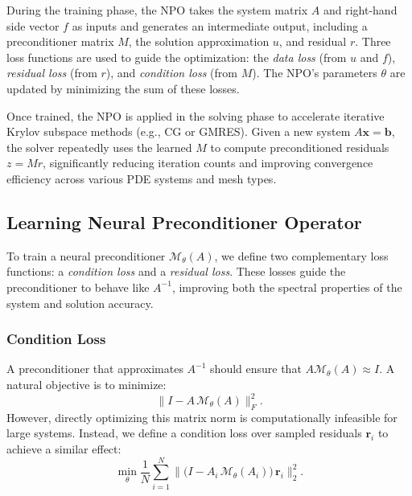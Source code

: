 During the training phase, the NPO takes the system matrix \(A\) and right-hand side vector \(f\) as inputs and generates an intermediate output, including a preconditioner matrix \(M\), the solution approximation \(u\), and residual \(r\). Three loss functions are used to guide the optimization: the \emph{data loss} (from \(u\) and \(f\)), \emph{residual loss} (from \(r\)), and \emph{condition loss} (from \(M\)). The NPO's parameters \(\theta\) are updated by minimizing the sum of these losses.

Once trained, the NPO is applied in the solving phase to accelerate iterative Krylov subspace methods (e.g., CG or GMRES). Given a new system \(A\mathbf{x} = \mathbf{b}\), the solver repeatedly uses the learned \(M\) to compute preconditioned residuals \(z = M r\), significantly reducing iteration counts and improving convergence efficiency across various PDE systems and mesh types.

\subsection{Learning Neural Preconditioner Operator}
\label{subsec:learning_npo}
To train a neural preconditioner \( \mathcal{M}_{\theta}(A) \), we define two complementary loss functions: a \emph{condition loss} and a \emph{residual loss}. These losses guide the preconditioner to behave like \( A^{-1} \), improving both the spectral properties of the system and solution accuracy.

\subsubsection{Condition Loss}

A preconditioner that approximates \( A^{-1} \) should ensure that \( A \mathcal{M}_{\theta}(A) \approx I \). A natural objective is to minimize:
\begin{equation}
    \label{eq:inverse_loss}
    \bigl\| I - A\,\mathcal{M}_{\theta}(A) \bigr\|_F^2.
\end{equation}
However, directly optimizing this matrix norm is computationally infeasible for large systems. Instead, we define a condition loss over sampled residuals \(\mathbf{r}_i\) to achieve a similar effect:
\begin{equation}
    \label{eq:condition_loss}
    \min_{\theta} \frac{1}{N} \sum_{i=1}^{N} \bigl\| \bigl(I - A_i\,\mathcal{M}_{\theta}(A_i)\bigr)\,\mathbf{r}_i \bigr\|_2^2.
\end{equation}

